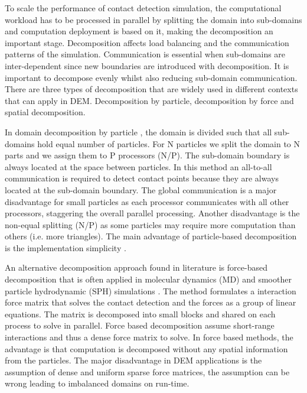 \documentclass[times,12pt]{article}
\begin{document}
To scale the performance of contact detection simulation, the computational workload has to be processed in parallel by splitting the domain into sub-domains and computation deployment is based on it, making the decomposition an important stage. Decomposition affects load balancing and the communication patterns of the simulation. Communication is essential when sub-domains are inter-dependent since new boundaries are introduced with decomposition. It is important to decompose evenly whilst also reducing sub-domain communication. There are three types of decomposition that are widely used in different contexts \cite{Eckhardt2014, Plimpton1995} that can apply in DEM. Decomposition by particle, decomposition by force and spatial decomposition. 

In domain decomposition by particle \cite{koziara2011}, the domain is divided such that all sub-domains hold equal number of particles. For N particles we split the domain to N parts and we assign them to P processors (N/P). The sub-domain boundary is always located at the space between particles. In this method an all-to-all communication is required to detect contact points because they are always located at the sub-domain boundary. The global communication is a major disadvantage for small particles as each processor communicates with all other processors, staggering the overall parallel processing. Another disadvantage is the non-equal splitting (N/P) as some particles may require more computation than others (i.e. more triangles). The main advantage of particle-based decomposition is the implementation simplicity \cite{Plimpton1995}.

An alternative decomposition approach found in literature is force-based decomposition that is often applied in molecular dynamics (MD) and smoother particle hydrodynamic (SPH) simulations \cite{Bowers2007, Gaburov, Gonnet2014, Plimpton1995, Rycroft2012, Shaw2005}. The method formulates a interaction force matrix that solves the contact detection and the forces as a group of linear equations. The matrix is decomposed into small blocks and shared on each process to solve in parallel. Force based decomposition assume short-range interactions and thus a dense force matrix to solve. In force based methods, the advantage is that computation is decomposed without any spatial information from the particles. The major disadvantage in DEM applications is the assumption of dense and uniform sparse force matrices, the assumption can be wrong leading to imbalanced domains on run-time.   
\end{document}
